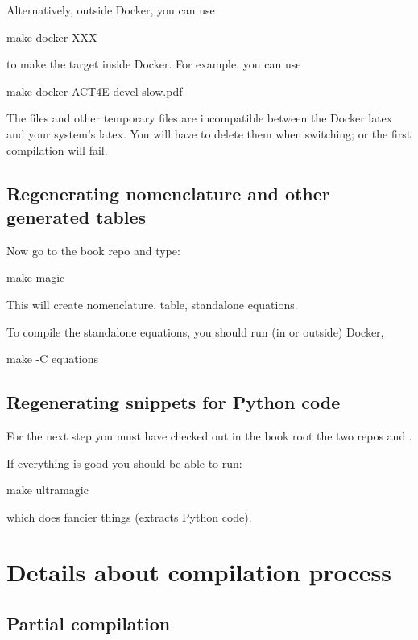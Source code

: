 Alternatively, outside Docker, you can use
\begin{console}
	make docker-XXX
\end{console}
to make the target  inside Docker.
For example, you can use
\begin{console}
	make docker-ACT4E-devel-slow.pdf
\end{console}
%

\begin{remark}
	The  files and other temporary files are incompatible between the Docker latex and your system's latex.
	You will have to delete them when switching; or the first compilation will fail.
\end{remark}

\subsection{Regenerating nomenclature and other generated tables}

Now go to the book repo and type:
%
\begin{console}
	make magic
\end{console}
%
This will create nomenclature, table, standalone equations.

To compile the standalone equations, you should run (in or outside) Docker,
%
\begin{console}
	make -C equations
\end{console}

\subsection{Regenerating snippets for Python code}

For the next step you must have checked out in the book root the two repos  and .

If everything is good you should be able to run:
%
\begin{console}
	make ultramagic
\end{console}
%
which does fancier things (extracts Python code).

\section{Details about compilation process}

\subsection{Partial compilation}

